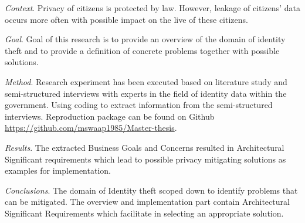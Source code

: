


\begin{abstracts}        %

\noindent \textit{Context}. 
Privacy of citizens is protected by law. However, leakage of citizens' data occurs more often with possible impact on the live of these citizens.

\noindent \textit{Goal}. 
Goal of this research is to provide an overview of the domain of identity theft and to provide a definition of concrete problems together with possible solutions.

\noindent \textit{Method}. 
Research experiment has been executed based on literature study and semi-structured interviews with experts in the field of identity data within the government. 
Using coding to extract information from the semi-structured interviews. Reproduction package can be found on Github \url{https://github.com/mswaap1985/Master-thesis}.

\noindent \textit{Results}. 
The extracted Business Goals and Concerns resulted in Architectural Significant requirements which lead to possible privacy mitigating solutions as examples for implementation.

\noindent \textit{Conclusions}. 
The domain of Identity theft scoped down to identify problems that can be mitigated. The overview and implementation part contain Architectural Significant Requirements which facilitate in selecting an appropriate solution. 

\end{abstracts}


